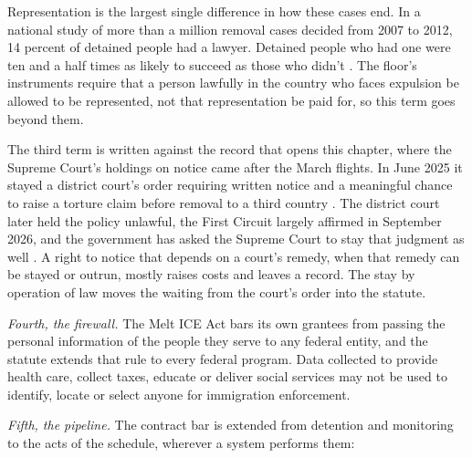 Representation is the largest single difference in how these cases end. In a national study of more than a million removal cases decided from 2007 to 2012, 14 percent of detained people had a lawyer. Detained people who had one were ten and a half times as likely to succeed as those who didn't \autocite{EaglyShafer2016Counsel}. The floor's instruments require that a person lawfully in the country who faces expulsion be allowed to be represented, not that representation be paid for, so this term goes beyond them.

The third term is written against the record that opens this chapter, where the Supreme Court's holdings on notice came after the March flights. In June 2025 it stayed a district court's order requiring written notice and a meaningful chance to raise a torture claim before removal to a third country \autocite{dvd2025}. The district court later held the policy unlawful, the First Circuit largely affirmed in September 2026, and the government has asked the Supreme Court to stay that judgment as well \autocite{dvd2026application}. A right to notice that depends on a court's remedy, when that remedy can be stayed or outrun, mostly raises costs and leaves a record. The stay by operation of law moves the waiting from the court's order into the statute.

\emph{Fourth, the firewall.} The Melt ICE Act bars its own grantees from passing the personal information of the people they serve to any federal entity, and the statute extends that rule to every federal program. Data collected to provide health care, collect taxes, educate or deliver social services may not be used to identify, locate or select anyone for immigration enforcement.

\emph{Fifth, the pipeline.} The contract bar is extended from detention and monitoring to the acts of the schedule, wherever a system performs them:


